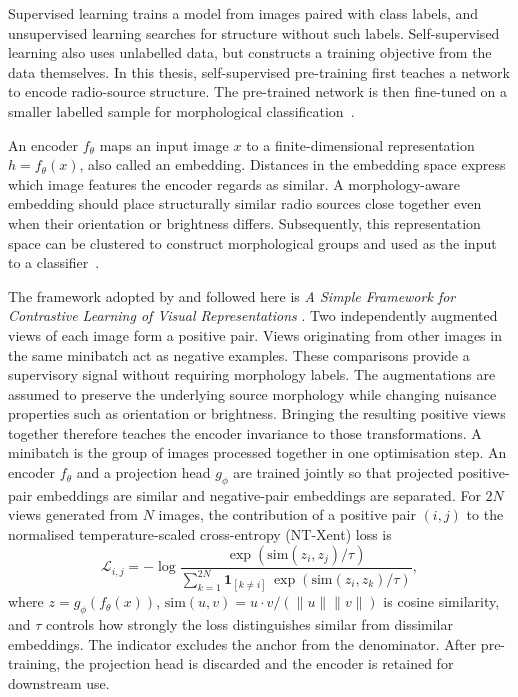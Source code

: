 Supervised learning trains a model from images paired with class labels, and unsupervised learning searches for structure without such labels.
Self-supervised learning also uses unlabelled data, but constructs a training objective from the data themselves.
In this thesis, self-supervised pre-training first teaches a network to encode radio-source structure.
The pre-trained network is then fine-tuned on a smaller labelled sample for morphological classification~\citep{Nicolas2025}.

An encoder $f_\theta$ maps an input image $x$ to a finite-dimensional representation $h=f_\theta(x)$, also called an embedding. 
Distances in the embedding space express which image features the encoder regards as similar.
A morphology-aware embedding should place structurally similar radio sources close together even when their orientation or brightness differs.
Subsequently, this representation space can be clustered to construct morphological groups and used as the input to a classifier~\citep{Nicolas2025,Slijepcevic2024}.

The framework adopted by \citet{Nicolas2025} and followed here is \textit{A Simple Framework for Contrastive Learning of Visual Representations} \citep[SimCLR;][]{Chen2020}.
Two independently augmented views of each image form a positive pair.
Views originating from other images in the same minibatch act as negative examples.
These comparisons provide a supervisory signal without requiring morphology labels.
The augmentations are assumed to preserve the underlying source morphology while changing nuisance properties such as orientation or brightness. Bringing the resulting positive views together therefore teaches the encoder invariance to those transformations. A minibatch is the group of images processed together in one optimisation step.
An encoder $f_\theta$ and a projection head $g_\phi$ are trained jointly so that projected positive-pair embeddings are similar and negative-pair embeddings are separated. 
For $2N$ views generated from $N$ images, the contribution of a positive pair $(i,j)$ to the normalised temperature-scaled cross-entropy (NT-Xent) loss is
\begin{equation}
\mathcal{L}_{i,j} = -\log \frac{\exp\!\left(\mathrm{sim}(z_i,z_j)/\tau\right)}{\sum_{k=1}^{2N}\mathbf{1}_{[k\neq i]}\,\exp\!\left(\mathrm{sim}(z_i,z_k)/\tau\right)},
\label{eq:ntxent}
\end{equation}
where $z=g_\phi(f_\theta(x))$, $\mathrm{sim}(u,v)=u\cdot v/(\lVert u\rVert\lVert v\rVert)$ is cosine similarity, and $\tau$ controls how strongly the loss distinguishes similar from dissimilar embeddings.
The indicator excludes the anchor from the denominator. After pre-training, the projection head is discarded and the encoder is retained for downstream use.

